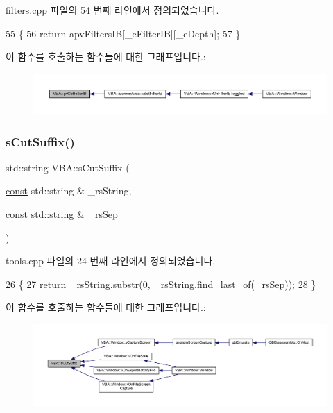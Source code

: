 filters.\+cpp 파일의 54 번째 라인에서 정의되었습니다.


\begin{DoxyCode}
55 \{
56   \textcolor{keywordflow}{return} apvFiltersIB[\_eFilterIB][\_eDepth];
57 \}
\end{DoxyCode}
이 함수를 호출하는 함수들에 대한 그래프입니다.\+:
\nopagebreak
\begin{figure}[H]
\begin{center}
\leavevmode
\includegraphics[width=350pt]{namespace_v_b_a_ad5980a2981a7b766dce52ebc49a987bb_icgraph}
\end{center}
\end{figure}
\mbox{\label{namespace_v_b_a_ad362cd74dbe4234578a0a124f3522dcf}} 
\subsubsection{\texorpdfstring{s\+Cut\+Suffix()}{sCutSuffix()}\hspace{0.1cm}{\footnotesize\ttfamily [1/2]}}
{\footnotesize\ttfamily std\+::string V\+B\+A\+::s\+Cut\+Suffix (\begin{DoxyParamCaption}\item[{\mbox{\hyperlink{getopt1_8c_a2c212835823e3c54a8ab6d95c652660e}{const}} std\+::string \&}]{\+\_\+rs\+String,  }\item[{\mbox{\hyperlink{getopt1_8c_a2c212835823e3c54a8ab6d95c652660e}{const}} std\+::string \&}]{\+\_\+rs\+Sep }\end{DoxyParamCaption})}



tools.\+cpp 파일의 24 번째 라인에서 정의되었습니다.


\begin{DoxyCode}
26 \{
27   \textcolor{keywordflow}{return} \_rsString.substr(0, \_rsString.find\_last\_of(\_rsSep));
28 \}
\end{DoxyCode}
이 함수를 호출하는 함수들에 대한 그래프입니다.\+:
\nopagebreak
\begin{figure}[H]
\begin{center}
\leavevmode
\includegraphics[width=350pt]{namespace_v_b_a_ad362cd74dbe4234578a0a124f3522dcf_icgraph}
\end{center}
\end{figure}
\mbox{\label{namespace_v_b_a_aa627086c3b36799bc10a36048e5c5b68}} 
